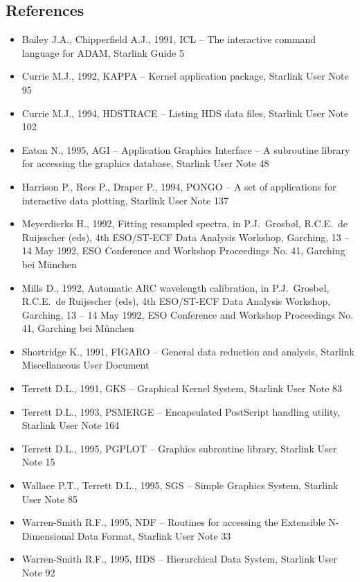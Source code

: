 
\newpage
\subsection{\label{specdrerefs}References}

\begin{itemize}
\item Bailey J.A., Chipperfield A.J., 1991, ICL -- The interactive
   command language for ADAM, Starlink Guide 5
\item Currie M.J., 1992, KAPPA -- Kernel application package, Starlink
   User Note 95
\item Currie M.J., 1994, HDSTRACE -- Listing HDS data files, Starlink
   User Note 102
\item Eaton N., 1995, AGI -- Application Graphics Interface -- A
   subroutine library for accessing the graphics database, Starlink User
   Note 48
\item Harrison P., Rees P., Draper P., 1994, PONGO -- A set of
   applications for interactive data plotting, Starlink User Note 137
\item Meyerdierks H., 1992, Fitting resampled spectra, in
   P.J.\ Grosb\o l, R.C.E.\ de Ruijsscher (eds), 4th ESO/ST-ECF Data
   Analysis Workshop, Garching, 13 -- 14 May 1992, ESO Conference and
   Workshop Proceedings No. 41, Garching bei M\"unchen
\item Mills D., 1992, Automatic ARC wavelength calibration, in
   P.J.\ Grosb\o l, R.C.E.\ de Ruijsscher (eds), 4th ESO/ST-ECF Data
   Analysis Workshop, Garching, 13 -- 14 May 1992, ESO Conference and
   Workshop Proceedings No. 41, Garching bei M\"unchen
\item Shortridge K., 1991, FIGARO -- General data reduction and
   analysis, Starlink Miscellaneous User Document
\item Terrett D.L., 1991, GKS -- Graphical Kernel System, Starlink
   User Note 83
\item Terrett D.L., 1993, PSMERGE -- Encapsulated PostScript
   handling utility, Starlink User Note 164
\item Terrett D.L., 1995, PGPLOT -- Graphics subroutine library,
   Starlink User Note 15
\item Wallace P.T., Terrett D.L., 1995, SGS -- Simple Graphics System,
   Starlink User Note 85
\item Warren-Smith R.F., 1995, NDF -- Routines for accessing the
   Extensible N-Dimensional Data Format, Starlink User Note 33
\item Warren-Smith R.F., 1995, HDS -- Hierarchical Data System, Starlink
   User Note 92
\end{itemize}


